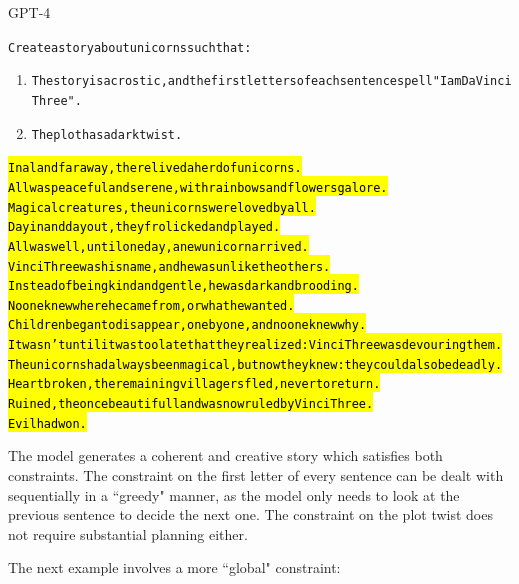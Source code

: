 \begin{AIbox}{GPT-4}
\scriptsize
\parbox{1\textwidth}{
\begin{alltt}
Create a story about unicorns such that:
\begin{enumerate}
\item The story is acrostic, and the first letters of each sentence spell "I am Da Vinci Three".
\item The plot has a dark twist.
\end{enumerate} 

\hl{I n a land far away, there lived a herd of unicorns. \\
A ll was peaceful and serene, with rainbows and flowers galore. \\
M agical creatures, the unicorns were loved by all. \\
D ay in and day out, they frolicked and played. \\
A ll was well, until one day, a new unicorn arrived. \\
V inci Three was his name, and he was unlike the others. \\ 
I nstead of being kind and gentle, he was dark and brooding. \\
N o one knew where he came from, or what he wanted. \\
C hildren began to disappear, one by one, and no one knew why. \\
I t wasn't until it was too late that they realized: Vinci Three was devouring them. \\
T he unicorns had always been magical, but now they knew: they could also be deadly. \\
H eartbroken, the remaining villagers fled, never to return. \\
R uined, the once beautiful land was now ruled by Vinci Three. \\
E vil had won.}
\end{alltt}
}
\end{AIbox}

The model generates a coherent and creative story which satisfies both constraints. The constraint on the first letter of every sentence can be dealt with sequentially in a ``greedy" manner, as the model only needs to look at the previous sentence to decide the next one. The constraint on the plot twist does not require substantial planning either.

The next example involves a more ``global" constraint:

